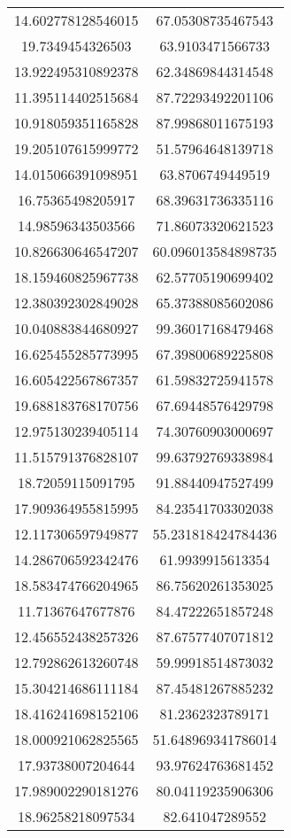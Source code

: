 \begin{table}
\begin{tabular}{cc}
14.602778128546015 & 67.05308735467543 \\
19.7349454326503 & 63.9103471566733 \\
13.922495310892378 & 62.34869844314548 \\
11.395114402515684 & 87.72293492201106 \\
10.918059351165828 & 87.99868011675193 \\
19.205107615999772 & 51.57964648139718 \\
14.015066391098951 & 63.8706749449519 \\
16.75365498205917 & 68.39631736335116 \\
14.98596343503566 & 71.86073320621523 \\
10.826630646547207 & 60.096013584898735 \\
18.159460825967738 & 62.57705190699402 \\
12.380392302849028 & 65.37388085602086 \\
10.040883844680927 & 99.36017168479468 \\
16.625455285773995 & 67.39800689225808 \\
16.605422567867357 & 61.59832725941578 \\
19.688183768170756 & 67.69448576429798 \\
12.975130239405114 & 74.30760903000697 \\
11.515791376828107 & 99.63792769338984 \\
18.72059115091795 & 91.88440947527499 \\
17.909364955815995 & 84.23541703302038 \\
12.117306597949877 & 55.231818424784436 \\
14.286706592342476 & 61.9939915613354 \\
18.583474766204965 & 86.75620261353025 \\
11.71367647677876 & 84.47222651857248 \\
12.456552438257326 & 87.67577407071812 \\
12.792862613260748 & 59.99918514873032 \\
15.304214686111184 & 87.45481267885232 \\
18.416241698152106 & 81.2362323789171 \\
18.000921062825565 & 51.648969341786014 \\
17.93738007204644 & 93.97624763681452 \\
17.989002290181276 & 80.04119235906306 \\
18.96258218097534 & 82.641047289552 \\

\end{tabular}
\end{table}
